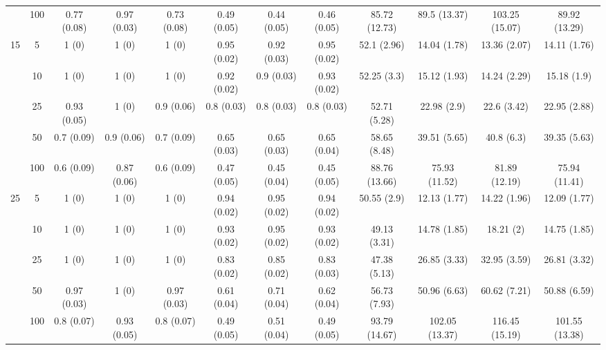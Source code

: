 \documentclass[10pt]{article}
\theoremstyle{definition}
\begin{document}
\begin{table}[H]
\begin{center}
{\begin{tabular}{cc|ccc|ccc|cccc|}
  & 100  & 0.77 (0.08) & 0.97 (0.03) & 0.73 (0.08) & 0.49 (0.05) & 0.44 (0.05) & 0.46 (0.05) & 85.72 (12.73) & 89.5 (13.37) & 103.25 (15.07) & 89.92 (13.29) \\[.3cm] 
 \multirow{5}{*}{15} & 5  & 1 (0) & 1 (0) & 1 (0) & 0.95 (0.02) & 0.92 (0.03) & 0.95 (0.02) & 52.1 (2.96) & 14.04 (1.78) & 13.36 (2.07) & 14.11 (1.76) \\ 
  & 10  & 1 (0) & 1 (0) & 1 (0) & 0.92 (0.02) & 0.9 (0.03) & 0.93 (0.02) & 52.25 (3.3) & 15.12 (1.93) & 14.24 (2.29) & 15.18 (1.9) \\ 
    & 25  & 0.93 (0.05) & 1 (0) & 0.9 (0.06) & 0.8 (0.03) & 0.8 (0.03) & 0.8 (0.03) & 52.71 (5.28) & 22.98 (2.9) & 22.6 (3.42) & 22.95 (2.88) \\ 
    & 50  & 0.7 (0.09) & 0.9 (0.06) & 0.7 (0.09) & 0.65 (0.03) & 0.65 (0.03) & 0.65 (0.04) & 58.65 (8.48) & 39.51 (5.65) & 40.8 (6.3) & 39.35 (5.63) \\ 
    & 100  & 0.6 (0.09) & 0.87 (0.06) & 0.6 (0.09) & 0.47 (0.05) & 0.45 (0.04) & 0.45 (0.05) & 88.76 (13.66) & 75.93 (11.52) & 81.89 (12.19) & 75.94 (11.41) \\[.3cm] 
   \multirow{5}{*}{25} & 5  & 1 (0) & 1 (0) & 1 (0) & 0.94 (0.02) & 0.95 (0.02) & 0.94 (0.02) & 50.55 (2.9) & 12.13 (1.77) & 14.22 (1.96) & 12.09 (1.77) \\ 
    & 10  & 1 (0) & 1 (0) & 1 (0) & 0.93 (0.02) & 0.95 (0.02) & 0.93 (0.02) & 49.13 (3.31) & 14.78 (1.85) & 18.21 (2) & 14.75 (1.85) \\ 
    & 25  & 1 (0) & 1 (0) & 1 (0) & 0.83 (0.02) & 0.85 (0.02) & 0.83 (0.03) & 47.38 (5.13) & 26.85 (3.33) & 32.95 (3.59) & 26.81 (3.32) \\ 
    & 50  & 0.97 (0.03) & 1 (0) & 0.97 (0.03) & 0.61 (0.04) & 0.71 (0.04) & 0.62 (0.04) & 56.73 (7.93) & 50.96 (6.63) & 60.62 (7.21) & 50.88 (6.59) \\ 
    & 100  & 0.8 (0.07) & 0.93 (0.05) & 0.8 (0.07) & 0.49 (0.05) & 0.51 (0.04) & 0.49 (0.05) & 93.79 (14.67) & 102.05 (13.37) & 116.45 (15.19) & 101.55 (13.38) \\
\end{tabular}}
   \end{center}
      \vspace{-.5cm}
\end{table}
\end{document}
